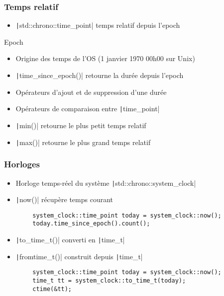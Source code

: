 \documentclass[C++.tex]{subfiles}
\begin{document}
\begin{frame}[fragile]
	\frametitle{Temps relatif}
	\begin{itemize}
		\item \texttt|std::chrono::time_point| temps relatif depuis l'epoch
	\end{itemize}

	\begin{block}{Epoch}
		\begin{itemize}
			\item Origine des temps de l'OS (1 janvier 1970 00h00 sur Unix)
		\end{itemize}
	\end{block}

	\begin{itemize}
		\item \texttt|time_since_epoch()| retourne la durée depuis l'epoch
		\item Opérateurs d'ajout et de suppression d'une durée
		\item Opérateurs de comparaison entre \texttt|time_point|
		\item \texttt|min()| retourne le plus petit temps relatif
		\item \texttt|max()| retourne le plus grand temps relatif
	\end{itemize}
\end{frame}

\begin{frame}[fragile]
	\frametitle{Horloges}
	\begin{itemize}
		\item Horloge temps-réel du système \texttt|std::chrono::system_clock|
		\item \texttt|now()| récupère temps courant
	\end{itemize}

	\begin{verbatim}
		system_clock::time_point today = system_clock::now();
		today.time_since_epoch().count();
	\end{verbatim}

	\begin{itemize}
		\item \texttt|to_time_t()| converti en \texttt|time_t|
		\item \texttt|fromtime_t()| construit depuis \texttt|time_t|
	\end{itemize}

	\begin{verbatim}
		system_clock::time_point today = system_clock::now();
		time_t tt = system_clock::to_time_t(today);
		ctime(&tt);
	\end{verbatim}
\end{frame}
\end{document}
